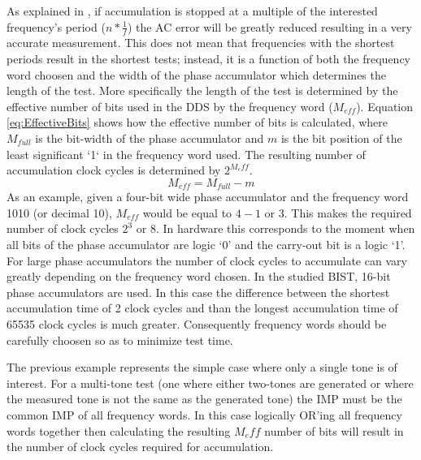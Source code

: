 \documentclass[12pt]{report}
\begin{document}
As explained in \cite{testtime}, if accumulation is stopped at a multiple of the interested frequency's period ($n*\frac{1}{f}$) the AC error will be greatly reduced resulting in a very accurate measurement.  This does not mean that frequencies with the shortest periods result in the shortest tests; instead, it is a function of both the frequency word choosen and the width of the phase accumulator which determines the length of the test.  More specifically the length of the test is determined by the effective number of bits used in the DDS by the frequency word ($M_{eff}$).  Equation \ref{eq:EffectiveBits} shows how the effective number of bits is calculated, where $M_{full}$ is the bit-width of the phase accumulator and $m$ is the bit position of the least significant `1` in the frequency word used\cite{jie}.  The resulting number of accumulation clock cycles is determined by $2^{M_eff}$.
\begin{equation}
	M_{eff} = M_{full} - m
	\label{eq:EffectiveBits}
\end{equation}
As an example, given a four-bit wide phase accumulator and the frequency word 1010 (or decimal 10), $M_{eff}$ would be equal to $4 - 1$ or 3.  This makes the required number of clock cycles $2^3$ or $8$.  In hardware this corresponds to the moment when all bits of the phase accumulator are logic `0' and the carry-out bit is a logic `1'\cite{jie}.  For large phase accumulators the number of clock cycles to accumulate can vary greatly depending on the frequency word chosen.  In the studied BIST, 16-bit phase accumulators are used.  In this case the difference between the shortest accumulation time of 2 clock cycles and than the longest accumulation time of 65535 clock cycles is much greater.  Consequently frequency words should be carefully choosen so as to minimize test time\cite{jie}.  

The previous example represents the simple case where only a single tone is of interest.  For a multi-tone test (one where either two-tones are generated or where the measured tone is not the same as the generated tone) the IMP must be the common IMP of all frequency words\cite{jie}.  In this case logically OR'ing all frequency words together then calculating the resulting $M_eff$ number of bits will result in the number of clock cycles required for accumulation\cite{jie}\cite{testtime}.
\end{document}
